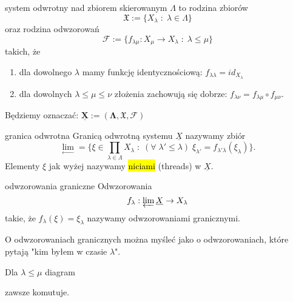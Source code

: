 \begin{definition}{system odwrotny}{}
   nad zbiorem skierowanym $\Lambda$ to rodzina zbiorów 
  $$\mathfrak{X}:=\{X_\lambda\;:\;\lambda\in\Lambda \}$$
  oraz rodzina odwzorowań
  $$\mathcal{F}:=\{f_{\lambda\mu}:X_\mu\to X_\lambda\;:\;\lambda\leq\mu \}$$
  takich, że 
  \begin{enumerate}
    \item dla dowolnego $\lambda$ mamy funkcję identycznościową: $f_{\lambda\lambda}=id_{X_\lambda}$
    \item dla dowolnych $\lambda\leq\mu\leq\nu$ złożenia zachowują się dobrze: $f_{\lambda\nu}=f_{\lambda\mu}\circ f_{\mu\nu}$.
  \end{enumerate}
\end{definition}

Będziemy oznaczać: $\boldsymbol{\underline{X}:=(\Lambda, \mathfrak{X}, \mathcal{F})}$

\begin{definition}{granica odwrotna}{}
  Granicą odwrotną systemu $\underline{X}$ nazywamy zbiór
  $$\underset{\leftarrow}{\lim}=\{\xi\in\prod_{\lambda\in\Lambda}X_\lambda\;:\;(\forall\;\lambda'\leq\lambda)\;\xi_{\lambda'}=f_{\lambda'\lambda}(\xi_\lambda)\}.$$
  Elementy $\xi$ jak wyżej nazywamy \hl{niciami} (threads) w $\underline{X}$.
\end{definition}

\begin{definition}{odwzorowania graniczne}{}
  Odwzorowania 
  $$f_\lambda:\varprojlim\underline{X}\to X_\lambda$$ 
  takie, że $f_\lambda(\xi)=\xi_\lambda$ nazywamy odwzorowaniami granicznymi.
\end{definition}

O odwzorowaniach granicznych można myśleć jako o odwzorowaniach, które pytają "kim byłem w czasie $\lambda$".

\begin{center}
\end{center}

Dla $\lambda\leq\mu$ diagram 
\begin{center}
\end{center}
zawsze komutuje.

